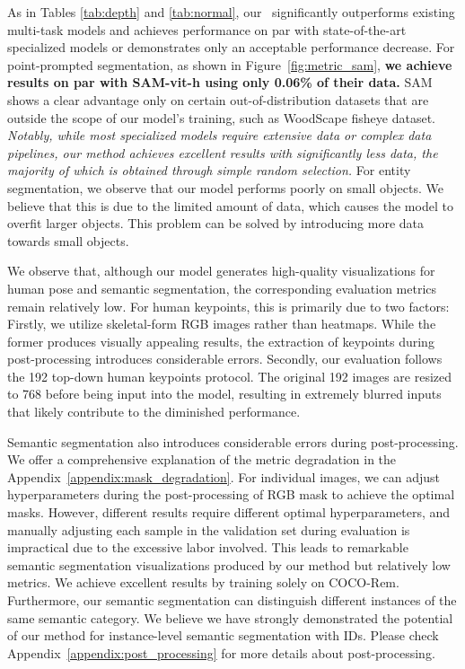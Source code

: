 As in Tables \ref{tab:depth} and \ref{tab:normal}, our \ours\ significantly outperforms existing multi-task models and achieves performance on par with state-of-the-art specialized models or demonstrates only an acceptable performance decrease. For point-prompted segmentation, as shown in Figure~\ref{fig:metric_sam}, \textbf{we achieve results on par with SAM-vit-h using only 0.06\% of their data.} SAM shows a clear advantage only on certain out-of-distribution datasets that are outside the scope of our model's training, such as WoodScape fisheye dataset. \textit{Notably, while most specialized models require extensive data or complex data pipelines, 
our method achieves excellent results with significantly less data, the majority of which is obtained through simple random selection.} 
For entity segmentation, we observe that our model performs poorly on small objects. We believe 
that 
this is due to the limited amount of data, which causes the model to overfit larger objects. This problem can be solved by introducing more data towards small objects.

We observe that, although our model generates high-quality visualizations for human pose and semantic segmentation, the corresponding evaluation metrics remain relatively low. 
For human keypoints, this is primarily due to two factors: Firstly, we utilize skeletal-form RGB images rather than heatmaps. While the former produces visually appealing results, the extraction of keypoints during post-processing introduces considerable errors. Secondly, our evaluation follows the 192 top-down human keypoints protocol. The original 192 images are resized to 768 before being input into the model, resulting in extremely blurred inputs that likely contribute to the diminished performance.

Semantic segmentation also introduces considerable errors during post-processing. We offer a comprehensive explanation of the metric degradation in the Appendix~\ref{appendix:mask_degradation}.
For individual images, we can adjust hyperparameters during the post-processing of RGB mask to achieve the optimal masks. However, different results require different optimal hyperparameters, and manually adjusting each sample in the validation set during evaluation is impractical due to the excessive labor involved. This leads to remarkable semantic segmentation visualizations produced by our method but relatively low metrics.
We achieve excellent results by training solely on COCO-Rem. Furthermore, our semantic segmentation can distinguish different instances of the same semantic category. We believe we have strongly demonstrated the potential of our method for instance-level semantic segmentation with IDs.
Please check Appendix~\ref{appendix:post_processing} for more details about post-processing.


